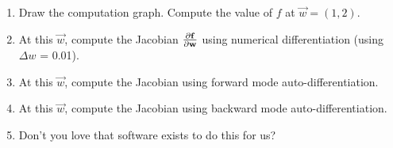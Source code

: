 \begin{enumerate}
\item Draw the computation graph. Compute the value of $f$ at $\vec{w} = (1, 2)$.
\item At this $\vec{w}$, compute the Jacobian $\frac{\partial \mathbf{f}} {\partial \mathbf{w}}$ using numerical differentiation (using $\Delta w$ = 0.01).
\item At this $\vec{w}$, compute the Jacobian using forward mode auto-differentiation.
\item At this $\vec{w}$, compute the Jacobian using backward mode auto-differentiation.
\item Don't you love that software exists to do this for us?
\end{enumerate}